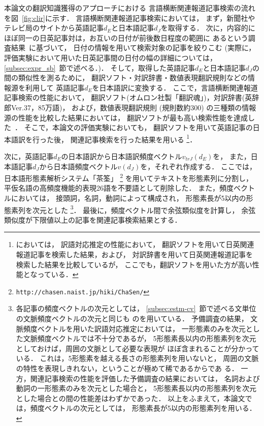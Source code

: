 本論文の翻訳知識獲得のアプローチにおける
言語横断関連報道記事検索の流れを図~\ref{fig:clir}に示す．
言語横断関連報道記事検索においては，
まず，新聞社やテレビ局のサイトから英語記事$d_E$と日本語記事$d_J$を取得する．
次に，内容的にほぼ同一の日英記事対は，お互いの日付が前後数日程度の範囲に
あるという調査結果~\cite{Horiuchi02aj,Horiuchi02bj}に基づいて，
日付の情報を用いて検索対象の記事を絞りこむ
(実際に，評価実験において用いた日英記事間の日付の幅の詳細については，
\ref{subsec:expr_sb}~節で述べる．)．
そして，取得した英語記事$d_E$と日本語記事$d_J$の間の類似性を測るために，
翻訳ソフト・対訳辞書・数値表現翻訳規則などの情報源を利用して
英語記事$d_E$を日本語訳に変換する．
ここで，言語横断関連報道記事検索の性能において，
翻訳ソフト(オムロン社製「翻訳魂」)，対訳辞書(英辞郎Ver.37，85万語)，
および，数値表現翻訳規則
(規則数約300)
の三種類の情報源の性能を比較した結果においては，
翻訳ソフトが最も高い検索性能を達成した~\cite{Hamamoto03aj}．
そこで，本論文の評価実験においても，
翻訳ソフトを用いて英語記事の日本語訳を行った後，
関連記事検索を行った結果を用いる
\footnote{
   \cite{Hino04aj}においては，
   訳語対応推定の性能において，
   翻訳ソフトを用いて日英関連報道記事を検索した結果，および，
   対訳辞書を用いて日英関連報道記事を検索した結果を比較しているが，
   ここでも，翻訳ソフトを用いた方が高い性能となっている．
}．

次に，英語記事$d_E$の日本語訳から日本語訳頻度ベクトル$v_{trJ}(d_E)$を，
また，日本語記事$d_J$から日本語頻度ベクトル$v(d_J)$を，それぞれ作成する．
ここでは，日本語形態素解析システム「茶筌」
\footnote{
  {\tt http://chasen.naist.jp/hiki/ChaSen/}
}
を用いてテキストを形態素列に分割し，
平仮名語の高頻度機能的表現26語を不要語として削除した．
また，頻度ベクトルにおいては，
接頭詞，名詞，動詞によって構成され，
形態素長が5以内の形態素列を次元とした
\footnote{
   各記事の頻度ベクトルの次元としては，
   \ref{subsec:estm-cv}~節で述べる文単位の文脈頻度ベクトルの次元と同じも
   のを用いている．
   予備調査の結果，
   文脈頻度ベクトルを用いた訳語対応推定においては，
   一形態素のみを次元とした文脈頻度ベクトルでは不十分であるが，
   5形態素長以内の形態素列を次元としておけば，周囲の文脈として必要な表現が
   ほぼ含まれることが分かっている．
   これは，5形態素を越える長さの形態素列を用いないと，
   周囲の文脈の特性を表現しきれない，ということが極めて稀であるからであ
   る．
   一方，関連記事検索の性能を評価した予備調査の結果においては，
   名詞および動詞の一形態素のみを次元とした場合と，
   5形態素長以内の形態素列を次元とした場合との間の性能差はわずかであった．
   以上をふまえて，本論文では，頻度ベクトルの次元としては，
   形態素長が5以内の形態素列を用いる．
}．
最後に，頻度ベクトル間で余弦類似度を計算し，
余弦類似度が下限値以上の記事を関連記事検索結果とする．

